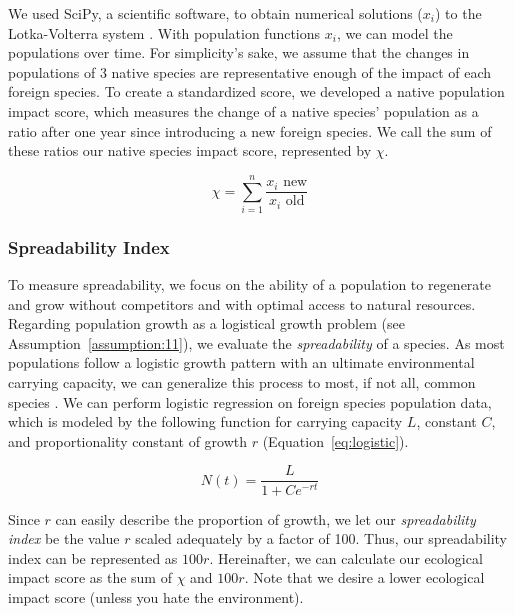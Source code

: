 We used SciPy, a scientific software, to obtain numerical solutions (\(x_i\)) to the Lotka-Volterra system \cite{scipy}. With population functions \(x_i\), we can model the populations over time. For simplicity's sake, we assume that the changes in populations of 3 native species are representative enough of the impact of each foreign species. To create a standardized score, we developed a native population impact score, which measures the change of a native species' population as a ratio after one year since introducing a new foreign species. We call the sum of these ratios our native species impact score, represented by \(\chi\).

\begin{equation}
    \chi = \sum_{i = 1}^n \frac{x_i {\text{ new}}}{x_i {\text{ old}}}
    \label{eq:nativeproportion}
\end{equation}

\subsubsection{Spreadability Index}

To measure spreadability, we focus on the ability of a population to regenerate and grow without competitors and with optimal access to natural resources. Regarding population growth as a logistical growth problem (see Assumption~\ref{assumption:11}), we evaluate the \textit{spreadability} of a species. As most populations follow a logistic growth pattern with an ultimate environmental carrying capacity, we can generalize this process to most, if not all, common species \cite{noauthor_53_nodate}. We can perform logistic regression on foreign species population data, which is modeled by the following function for carrying capacity \(L\), constant \(C\), and proportionality constant of growth \(r\) 
(Equation~\ref{eq:logistic}). 

\begin{equation}
    N(t) = \frac{L}{1+Ce^{-rt}}
    \label{eq:logistic}
\end{equation}

Since \(r\) can easily describe the proportion of growth, we let our \textit{spreadability index} be the value \(r\) scaled adequately by a factor of 100. Thus, our spreadability index can be represented as \(100r\). Hereinafter, we can calculate our ecological impact score as the sum of \(\chi\) and \(100r\). Note that we desire a lower ecological impact score (unless you hate the environment). 

